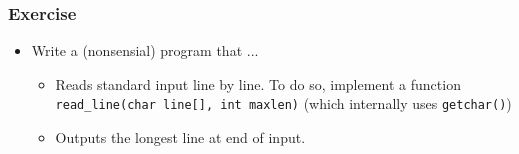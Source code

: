 \begin{frame}
  \frametitle{Exercise}

  \begin{itemize}
  \item Write a (nonsensial) program that ...
    \begin{itemize}
    \item Reads standard input line by line. To do so, implement a
      function \texttt{read\_line(char line[], int maxlen)} (which
      internally uses \texttt{getchar()})
    \item Outputs the longest line at end of input.
    \end{itemize}
  \end{itemize}
  
\end{frame}

